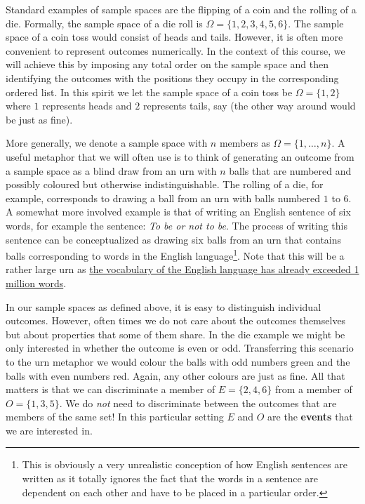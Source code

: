 \documentclass[a4paper,11pt,leqno]{report}
\begin{document}
Standard examples of sample spaces are the flipping of a coin and the rolling of a die. Formally,
the sample space of a die roll is $ \Omega = \{1,2,3,4,5,6\} $. The sample space of a coin toss
would consist of heads and tails. However, it is often more convenient to represent outcomes numerically.
In the context of this course, we will achieve this by imposing any total order on the sample space and then identifying the outcomes with the positions they occupy in the corresponding ordered list. In this spirit we let 
the sample space of a coin toss be $ \Omega = \{1,2\} $ where $ 1 $ represents heads and $ 2 $ represents
tails, say (the other way around would be just as fine). 

More generally, we denote a sample space with $ n $ members as $ \Omega = \{1,\ldots,n\} $. A useful 
metaphor that we will often use is to think of generating an outcome from a sample space as a blind draw from an urn with $ n $ balls 
that are numbered and possibly coloured but otherwise indistinguishable. The rolling of a die, for example,
corresponds to drawing a ball from an urn with balls numbered $ 1 $ to $ 6 $. A somewhat more involved 
example is that of writing an English sentence of six words, for example the sentence: 
\textit{To be or not to be}. The process of writing this sentence can be conceptualized as drawing 
six balls from an urn that contains balls corresponding to words
in the English language\footnote{This is obviously a very unrealistic conception of how English
sentences are written as it totally ignores the fact that the words in a sentence are dependent on each
other and have to be placed in a particular order.}. Note that this will be a rather large urn as 
\href{http://www.languagemonitor.com/number-of-words/number-of-words-in-the-english-language-1008879}
{the vocabulary of the English language has already exceeded 1 million words}.

In our sample spaces as defined above, it is easy to distinguish individual outcomes. However, often times
we do not care about the outcomes themselves but about properties that some of them share. In the
die example we might be only interested in whether the outcome is even or odd. Transferring this scenario to the urn metaphor we would colour the balls with odd numbers green and the balls
with even numbers red. Again, any other colours are just as fine. All that matters is that 
we can discriminate a member of $ E = \{2,4,6\} $ from a member of $ O = \{1,3,5\} $. We do \textit{not}
need to discriminate between the outcomes that are members of the same set! In this particular setting
$ E $ and $ O $ are the \textbf{events} that we are interested in.
\end{document}
